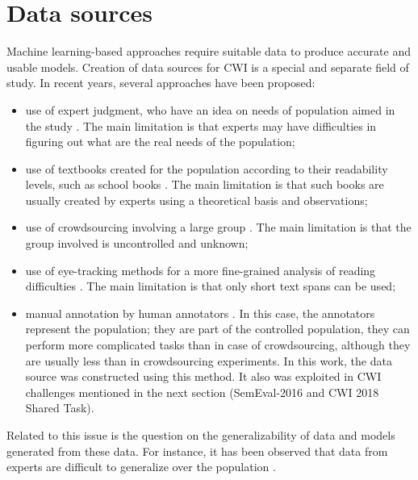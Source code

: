 \section{Data sources}

Machine learning-based approaches require suitable data to produce accurate and usable models. Creation of data sources for CWI is a special and separate field of study. In recent years, several approaches have been proposed:

\begin{itemize}
\item use of expert judgment, who have an idea on needs of population aimed in the study \citep{DeClerc-NLE2014}. The main limitation is that experts may have difficulties in figuring out what are the real needs of the population;

\item use of textbooks created for the population according to their readability levels, such as school books \citep{Gala-ELEX2013}. The main limitation is that such books are  usually created by experts using a theoretical basis and observations;

\item use of crowdsourcing involving a large group \citep{DeClerc-NLE2014}.  The main limitation is that the group involved is uncontrolled and unknown;

\item use of eye-tracking methods for a more fine-grained analysis of reading difficulties \citep{Yaneva-CCA2015,Grabar-ICHI2018}.  The main limitation is that only short text spans can be used;
  
\item manual annotation by human annotators \citep{Grabar-LREC2016t}.
In this case, the annotators represent the population; they are part of the controlled population, they can perform more complicated tasks than in case of crowdsourcing, although they are usually less than in crowdsourcing experiments. In this work, the data source was constructed using this method. It also was exploited in CWI challenges mentioned in the next section (SemEval-2016 and CWI 2018 Shared Task).

\end{itemize}

Related to this issue is the question on the generalizability of data and models generated from these data.  For instance, it has been observed that data from experts are difficult to generalize over the population \citep{DeClerc-NLE2014}.


